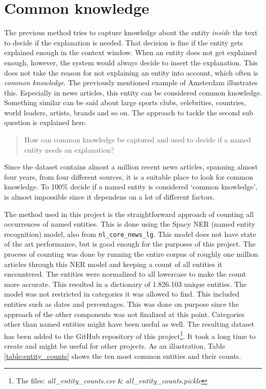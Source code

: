 \documentclass[
10pt, %
a4paper, %
oneside, %
headinclude,footinclude, %
] {book}%
\begin{document}
\section{Common knowledge}
The previous method tries to capture knowledge about the entity \textit{inside} the text to decide if the explanation is needed.
That decision is fine if the entity gets explained enough in the context window.
When an entity does not get explained enough, however, the system would always decide to insert the explanation.
This does not take the reason for not explaining an entity into account, which often is \textit{common knowledge}.
The previously mentioned example of Amsterdam illustrates this.
Especially in news articles, this entity can be considered common knowledge.
Something similar can be said about large sports clubs, celebrities, countries, world leaders, artists, brands and so on.
The approach to tackle the second sub question is explained here.
\begin{quote}
  How can common knowledge be captured and used to decide if a named entity needs an explanation?
\end{quote}

Since the dataset contains almost a million recent news articles, spanning almost four years, from four different sources, it is a suitable place to look for common knowledge.
To 100\% decide if a named entity is considered `common knowledge', is almost impossible since it dependens on a lot of different factors.

The method used in this project is the straightforward approach of counting all occurrences of named entities.
This is done using the Spacy NER (named entity recognition) model, also from \verb+nl_core_news_lg+.
This model does not have state of the art performance, but is good enough for the purposes of this project.
The process of counting was done by running the entire corpus of roughly one million articles through this NER model and keeping a count of all entities it encountered.
The entities were normalized to all lowercase to make the count more accurate.
This resulted in a dictionary of 1.826.103 unique entities.
The model was not restricted in categories it was allowed to find.
This included entities such as dates and percentages.
This was done on purpose since the approach of the other components was not finalized at this point.
Categories other than named entities might have been useful as well.
The resulting dataset has been added to the GitHub repository of this project\footnote{The files: \textit{all\_entity\_counts.csv} \& \textit{all\_entity\_counts.pickle}}.
It took a long time to create and might be useful for other projects.
As an illustration, Table \ref{table:entity_counts} shows the ten most common entities and their counts.
\end{document}
